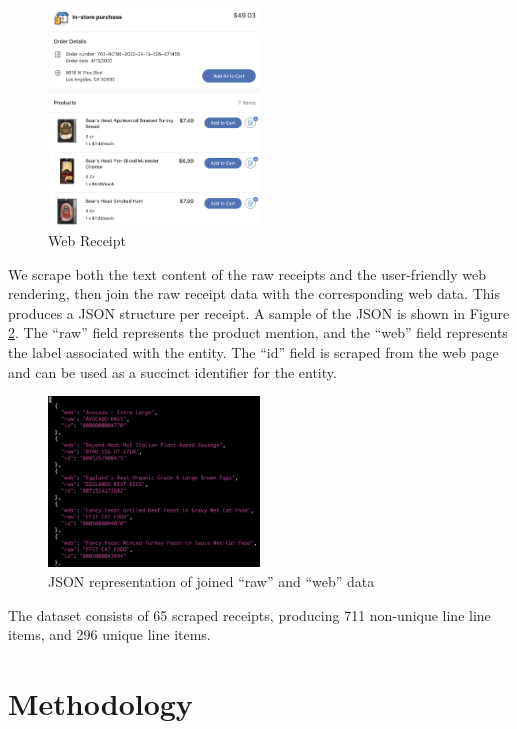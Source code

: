\documentclass[11pt,a4paper]{article}
\begin{document}
\begin{figure}[h]
  \centering
\includegraphics[width=0.5\textwidth]{web_receipt}
\caption{Web Receipt}
\label{fig:web}
\end{figure}

We scrape both the text content of the raw receipts and the
user-friendly web rendering, then join the raw receipt data with the
corresponding web data.  This produces a JSON structure per receipt.
A sample of the JSON is shown in Figure \ref{fig:json}.  The ``raw''
field represents the product mention, and the ``web'' field represents
the label associated with the entity.  The ``id'' field is scraped from
the web page and can be used as a succinct identifier for the entity. 

\begin{figure}[h]
  \centering
\includegraphics[width=0.5\textwidth]{json}
\caption{JSON representation of joined ``raw'' and ``web'' data}
\label{fig:json}
\end{figure}

The dataset consists of 65 scraped receipts, producing 711 non-unique line
line items, and 296 unique line items.


\section{Methodology}
\end{document}
